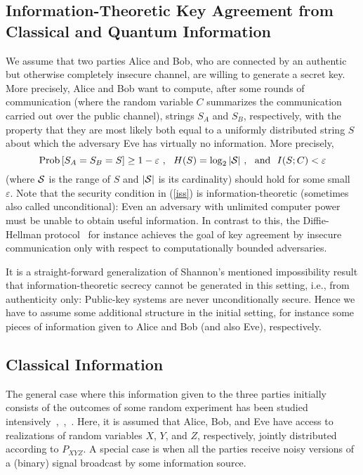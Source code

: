 \documentclass{article}
\newcommand{\prob}{{\rm Prob\,}}
\newcommand{\ep}{\varepsilon}
\begin{document}
\subsection{Information-Theoretic Key Agreement from Classical and Quantum 
Information}

We assume 
 that two parties Alice and Bob, who  are connected by an authentic 
but otherwise completely insecure channel,  are willing to generate a
secret key. More precisely,
Alice and Bob want to compute, after some rounds of communication
(where the random variable $C$ summarizes the communication 
carried out over the public channel), strings $S_A$ and $S_B$, respectively,
with the property that they are most likely
both equal to a uniformly distributed 
string $S$ about which the adversary Eve has virtually no information.
More precisely, 
\begin{equation}\label{iss}
\prob[S_A=S_B=S]\geq 1-\ep\ ,\ \ H(S)=\log_2|{\cal S}|
\ ,\ \ \mbox{and}\ \ I(S;C)<\ep
\end{equation}
(where ${\cal S}$ is the range of $S$ and $|{\cal S}|$ is its cardinality)
should hold for some small~$\ep$. 
Note that the security condition in  (\ref{iss}) is 
information-theoretic (sometimes also called unconditional): Even 
an adversary with unlimited computer power must be unable to 
obtain  useful information. In contrast to this, 
the Diffie-Hellman protocol~\cite{difhel76}
for instance achieves the goal of key agreement by insecure communication
only with respect to  computationally bounded adversaries. 

It is a straight-forward generalization of Shannon's mentioned
impossibility result that information-theoretic 
secrecy cannot be generated in this setting, i.e., 
 from authenticity only: Public-key 
systems are never unconditionally secure.
Hence we have to assume some additional structure in the initial
setting, for 
instance some pieces of information given to Alice and Bob (and also Eve),
respectively.





\subsection{Classical Information}\label{classical}

The general case where this information given to the three parties initially 
consists of the outcomes of some random experiment has been studied 
intensively~\cite{ka},\, 
\cite{ittrans},\, \cite{diss}. Here, it is assumed that 
Alice, Bob, and Eve have access to realizations of random
variables $X$, $Y$, and $Z$, respectively, 
jointly distributed according to $P_{XYZ}$.
A special case is 
when all the parties receive noisy versions of a (binary)
signal broadcast 
by some information source. 
\end{document}
